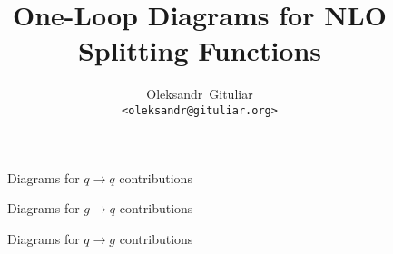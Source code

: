 \documentclass[11pt,a4paper]{article}
\begin{document}
\title{One-Loop Diagrams for NLO Splitting Functions}
\author{Oleksandr~Gituliar \\ \texttt{\small <oleksandr@gituliar.org>}}
\maketitle

\begin{figure}[ht]
  \centering

  \hspace{4mm}
  \hspace{4mm}
  \hspace{4mm}
  \hspace{4mm}

  \caption{Diagrams for $q\to q$ contributions}
\end{figure}


\begin{figure}[ht]
  \centering

  \hspace{4mm}
  \hspace{4mm}
  \hspace{4mm}

  \caption{Diagrams for $g\to q$ contributions}
\end{figure}


\begin{figure}[ht]
  \centering

  \hspace{4mm}
  \hspace{4mm}
  \hspace{4mm}
  \hspace{4mm}

  \caption{Diagrams for $q\to g$ contributions}
\end{figure}
\end{document}
